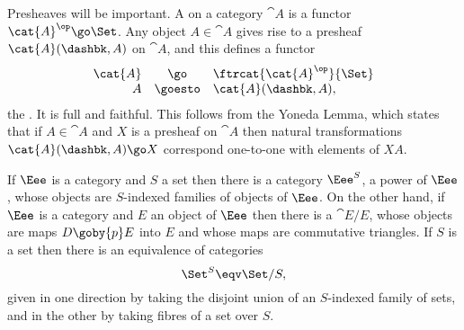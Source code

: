 %
Presheaves will be important.  A  on a category $\cat{A}$
is a functor $\cat{A}^\op \go \Set$.  Any object $A \in \cat{A}$ gives rise
to a presheaf $\cat{A}(\dashbk, A)$ on $\cat{A}$, and this defines a
functor
\[
\begin{array}{rcl}
\cat{A}		&\go		&\ftrcat{\cat{A}^\op}{\Set}	\\
A		&\goesto	&\cat{A}(\dashbk, A),
\end{array}
\]
the .%
%
%
 It is full and faithful.  This follows from
the Yoneda Lemma,%
%
%
which states that if $A \in \cat{A}$ and $X$ is a
presheaf on $\cat{A}$ then natural transformations $\cat{A}(\dashbk, A) \go
X$ correspond one-to-one with elements of $XA$.

If $\Eee$ is a category and $S$ a set then there is a category $\Eee^S$,%
% 
%
a
power%
%
%
of $\Eee$, whose objects are $S$-indexed families of objects of
$\Eee$.  On the other hand, if $\Eee$ is a category and $E$ an object of
$\Eee$ then there is a  $\cat{E}/E$,%
% 
%
whose objects
are maps $D \goby{p} E$ into $E$ and whose maps are commutative triangles.
If $S$ is a set then there is an equivalence of categories
%
\begin{equation}	\label{eq:Set-slice-power}
\Set^S \eqv \Set/S,
\end{equation}
%
given in one direction by taking the disjoint union of an $S$-indexed
family of sets, and in the other by taking fibres of a set over $S$.


